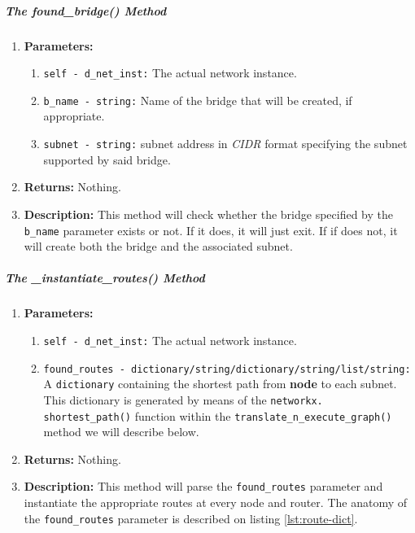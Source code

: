     \subparagraph{The found\_bridge() Method}
        \begin{enumerate}
            \item \textbf{Parameters:}
            \begin{enumerate}
                \item \texttt{self - d\_net\_inst:} The actual network instance.
                \item \texttt{b\_name - string:} Name of the bridge that will be created, if appropriate.
                \item \texttt{subnet - string:} subnet address in \textit{CIDR} format specifying the subnet supported by said bridge.
            \end{enumerate}
            \item \textbf{Returns:} Nothing.
            \item \textbf{Description:} This method will check whether the bridge specified by the \texttt{b\_name} parameter exists or not. If it does, it will just exit. If if does not, it will create both the bridge and the associated subnet.
        \end{enumerate}

    \subparagraph{The \_instantiate\_routes() Method}
        \begin{enumerate}
            \item \textbf{Parameters:}
            \begin{enumerate}
                \item \texttt{self - d\_net\_inst:} The actual network instance.
                \item \texttt{found\_routes - dictionary/string/dictionary/string/list/string:} A \texttt{dictionary} containing the shortest path from \textbf{node} to each subnet. This dictionary is generated by means of the \texttt{\allowbreak networkx. shortest\_path()} function within the \texttt{translate\_n\_execute\_graph()} method we will describe below.
            \end{enumerate}
            \item \textbf{Returns:} Nothing.
            \item \textbf{Description:} This method will parse the \texttt{found\_routes} parameter and instantiate the appropriate routes at every node and router. The anatomy of the \texttt{found\_routes} parameter is described on listing \ref{lst:route-dict}.
        \end{enumerate}

